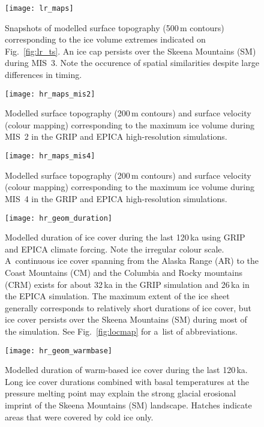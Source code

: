 \documentclass[tc, manuscript]{copernicus}
\begin{document}
\begin{figure}%
\texttt{[image: lr\_maps]}
\caption{%
Snapshots of modelled surface topography (500\,\unit{m} contours)
           corresponding to the ice volume extremes indicated on
           Fig.~\ref{fig:lr_ts}. An ice cap persists over the Skeena
           Mountains (SM) during MIS~3. Note the occurence of spatial
           similarities despite large differences in timing.}
\label{fig:lr_maps}%
\end{figure}%


\begin{figure}%
\texttt{[image: hr\_maps\_mis2]}
\caption{%
Modelled surface topography (200\,\unit{m} contours) and surface velocity
           (colour mapping) corresponding to the maximum ice volume during
           MIS~2 in the GRIP and EPICA high-resolution simulations.}
\label{fig:mis2}%
\end{figure}%


\begin{figure}%
\texttt{[image: hr\_maps\_mis4]}
\caption{%
Modelled surface topography (200\,\unit{m} contours) and surface velocity
           (colour mapping) corresponding to the maximum ice volume during
           MIS~4 in the GRIP and EPICA high-resolution simulations.}
\label{fig:mis4}%
\end{figure}%


\begin{figure}%
\texttt{[image: hr\_geom\_duration]}
\caption{%
Modelled duration of ice cover during the last 120\,\unit{ka} using GRIP
           and EPICA climate forcing.
           Note the irregular colour scale. A~continuous ice cover spanning
           from the Alaska Range (AR) to the Coast Mountains (CM) and
           the Columbia and Rocky mountains (CRM) exists for about 32\,\unit{ka} in
           the GRIP simulation and 26\,\unit{ka} in the EPICA simulation.
           The maximum extent of the ice sheet generally
           corresponds to relatively short durations of ice cover, but ice
           cover persists over the Skeena Mountains (SM) during most of the
           simulation. See Fig.~\ref{fig:locmap} for a~list of abbreviations.}
\label{fig:hr_geom_duration}%
\end{figure}%


\begin{figure}%
\texttt{[image: hr\_geom\_warmbase]}
\caption{%
Modelled duration of warm-based ice cover during the last
           120\,\unit{ka}. Long ice cover durations combined with basal
           temperatures at the pressure melting point may explain the strong
           glacial erosional imprint of the Skeena Mountains (SM) landscape.
           Hatches indicate areas that were covered by cold ice only.}
\label{fig:hr_geom_warmbase}%
\end{figure}%
\end{document}
